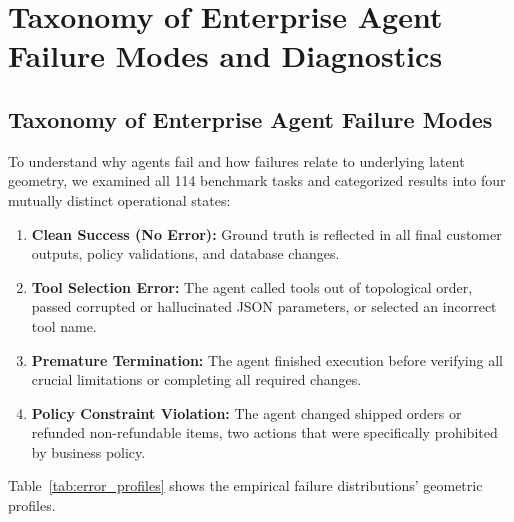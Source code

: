 \documentclass[a4paper, 12pt]{report}
\begin{document}
\chapter{Taxonomy of Enterprise Agent Failure Modes and Diagnostics}
\fi

\label{chap.7}
\section{Taxonomy of Enterprise Agent Failure Modes}
To understand why agents fail and how failures relate to underlying latent geometry, we examined all 114 benchmark tasks and categorized results into four mutually distinct operational states:
\begin{enumerate}
    \item \textbf{Clean Success (No Error):} Ground truth is reflected in all final customer outputs, policy validations, and database changes.
    \item \textbf{Tool Selection Error:} The agent called tools out of topological order, passed corrupted or hallucinated JSON parameters, or selected an incorrect tool name.
    \item \textbf{Premature Termination:} The agent finished execution before verifying all crucial limitations or completing all required changes.
    \item \textbf{Policy Constraint Violation:} The agent changed shipped orders or refunded non-refundable items, two actions that were specifically prohibited by business policy.
\end{enumerate}

Table~\ref{tab:error_profiles} shows the empirical failure distributions' geometric profiles.
\end{document}
